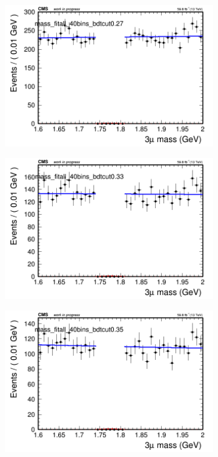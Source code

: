 \begin{figure}[H]
\begin{subfigure}{0.2\textwidth}
        \caption{}
    \end{subfigure}
    \begin{subfigure}{0.2\textwidth}
        \includegraphics[width=\textwidth]{power_law/plots/all/massfit_all_40bins_bdtcut0.27.png}
        \caption{}
    \end{subfigure}
    \begin{subfigure}{0.2\textwidth}
        \includegraphics[width=\textwidth]{power_law/plots/all/massfit_all_40bins_bdtcut0.33.png}
        \caption{}
    \end{subfigure}
    \begin{subfigure}{0.2\textwidth}
        \includegraphics[width=\textwidth]{power_law/plots/all/massfit_all_40bins_bdtcut0.35.png}

\end{subfigure}
\end{figure}
